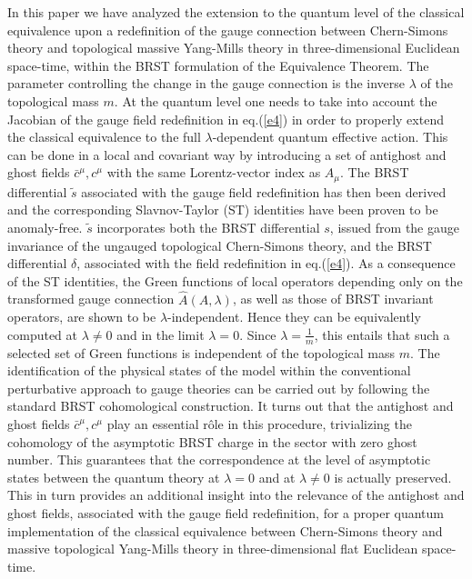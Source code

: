 \documentclass[a4paper,11pt]{article}
\begin{document}
In this paper we have analyzed the extension to the quantum level of  
the classical equivalence upon a redefinition of the gauge connection
between Chern-Simons theory and topological massive Yang-Mills theory
in three-dimensional Euclidean space-time,
within the BRST formulation of the Equivalence Theorem. 
The parameter controlling the change in the gauge connection 
is the inverse $\lambda$ of the topological mass $m$.  
At the quantum level one needs to take into account the Jacobian
of the gauge field redefinition in eq.(\ref{e4}) in order to
properly extend the classical equivalence to the full
$\lambda$-dependent quantum effective action.
This can be done in a local and covariant way by introducing 
a set of antighost and ghost fields $\bar c^\mu, c^\mu$ with the
same Lorentz-vector index as $A_\mu$.
%
The BRST differential $\tilde s$ associated with the gauge field
redefinition has then been derived and the corresponding Slavnov-Taylor (ST) 
identities have been proven to be anomaly-free.
$\tilde s$ incorporates both the BRST differential $s$, issued from
the gauge invariance of the ungauged topological Chern-Simons theory,
and the BRST differential $\delta$, associated with the field
redefinition in eq.(\ref{e4}).
As a consequence of the ST identities, 
the Green functions of local operators depending only 
on the transformed
gauge connection $\hat A(A,\lambda)$, 
as well as those of BRST invariant operators,
are shown to be $\lambda$-independent.
Hence they can be equivalently computed at $\lambda \neq 0$ and
in the limit $\lambda =0$. Since $\lambda=\frac{1}{m}$, this entails
that such a  selected set of Green functions is independent of 
the topological mass $m$.
The identification of the physical states of the model within
the conventional perturbative approach to gauge theories can be 
carried out by following the standard BRST cohomological construction.
It turns out that the antighost and ghost fields $\bar c^\mu,c^\mu$
play an essential r\^ole in this
procedure, trivializing the cohomology of the asymptotic BRST charge 
in the sector with zero ghost number.
This guarantees that the correspondence at the level of asymptotic
states between the quantum theory at $\lambda =0$ and at $\lambda \neq 0$  
is actually preserved.
This in turn provides an additional insight into the relevance of 
the antighost and ghost fields, associated with the gauge field redefinition,
for a proper quantum implementation of 
the classical equivalence between Chern-Simons
theory and massive topological Yang-Mills theory
in three-dimensional flat Euclidean space-time.
\end{document}
